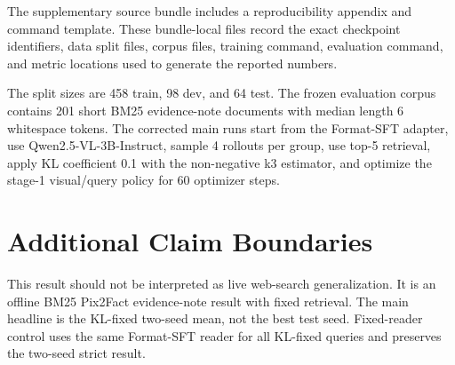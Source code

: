 The supplementary source bundle includes a reproducibility appendix and command template. These bundle-local files record the exact checkpoint identifiers, data split files, corpus files, training command, evaluation command, and metric locations used to generate the reported numbers.

The split sizes are 458 train, 98 dev, and 64 test. The frozen evaluation corpus contains 201 short BM25 evidence-note documents with median length 6 whitespace tokens. The corrected main runs start from the Format-SFT adapter, use Qwen2.5-VL-3B-Instruct, sample 4 rollouts per group, use top-5 retrieval, apply KL coefficient 0.1 with the non-negative k3 estimator, and optimize the stage-1 visual/query policy for 60 optimizer steps.

\section{Additional Claim Boundaries}

This result should not be interpreted as live web-search generalization. It is an offline BM25 Pix2Fact evidence-note result with fixed retrieval. The main headline is the KL-fixed two-seed mean, not the best test seed. Fixed-reader control uses the same Format-SFT reader for all KL-fixed queries and preserves the two-seed strict result.

